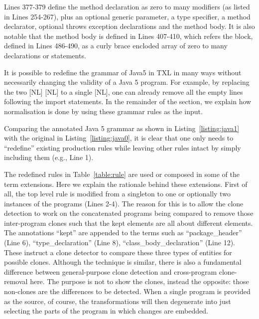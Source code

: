 \documentclass[10pt, conference, compsocconf]{IEEEtran}
\begin{document}
Lines 377-379 define the method declaration as zero to many modifiers (as listed in Lines 254-267), plus an optional generic parameter, a type specifier, a method declarator, optional throws exception declarations and the method body. 
It is also notable that the method body is defined in Lines 407-410, which refers the block, defined in Lines 486-490, as a curly brace encloded array of zero to many declarations or statements.



It is possible to redefine the grammar of Java5 in TXL in many ways without necessarily changing the validity of a Java 5 program. For example, by replacing the two [NL] [NL] to a single [NL], one can already remove all the empty lines following the import statements. In the remainder of the section, we explain how normalisation is done by using these grammar rules as the input.

Comparing the annotated Java 5 grammar as shown in Listing~\ref{listing:java1} with the original in Listing~\ref{listing:java0}, it is clear that one only needs to ``redefine'' existing production rules while leaving other rules intact by simply including them (e.g., Line 1).

The redefined rules in Table~\ref{table:rule} are used or composed in some of the term extensions. Here we explain the rationale behind these extensions. First of all, the top level rule is modified from a singleton to one or optionally two instances of the programs (Lines 2-4). The reason for this is to allow the clone detection to work on the concatenated programs being compared to remove those inter-program clones such that the kept elements are all about different elements. The annotations ``kept'' are appended to the terms such as ``package\_header'' (Line 6), ``type\_declaration'' (Line 8), ``class\_body\_declaration'' (Line 12). These instruct a clone detector to compare these three types of entities for possible clones. Although the technique is similar, there is also a fundamental difference between general-purpose clone detection and cross-program clone-removal here. The purpose is not to show the clones, instead the opposite: those non-clones are the differences to be detected.
When a single program is provided as the source, of course, the transformations will then degenerate into just selecting the  parts of the program in which changes are embedded.
\end{document}
